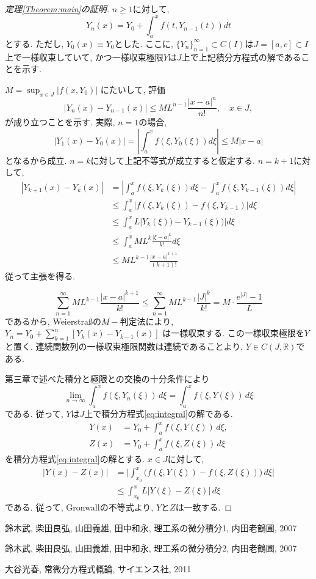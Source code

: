 \documentclass[12pt,xelatex,ja=standard]{bxjsarticle}
\begin{document}
\begin{proof}[定理\ref{Theorem:main}の証明]
$n \geq 1$に対して,
	\[
	Y_{n}(x)=Y_{0}+\displaystyle \int_{a}^{x} f(t,Y_{n-1}(t)) dt
	\]
とする. ただし, $Y_{0}(x) \equiv Y_0$とした.
ここに,
$\{Y_{n}\}_{n=1}^{\infty} ⊂ C(I)$は$J = [a,c] ⊂ I$上で一様収束していて,
かつ一様収束極限$Y$は$J$上で上記積分方程式の解であることを示す.

$M = \sup_{x \in J} |f(x, Y_0)|$
にたいして,
評価
	\[
	| Y_{n}(x) - Y_{n-1}(x) |
	\leq M L^{n-1} \frac{|x - a|^{n}}{n!}, \quad x \in J,
	\]
が成り立つことを示す.
実際, $n=1$の場合,
	\[
	\left| Y_{1}(x)-Y_{0}(x) \right|
	=\left|\displaystyle \int_{a}^{x} f(\xi,Y_{0}(\xi)) d\xi
	\right|\leq M|x-a|
	\]
となるから成立.
$n=k$に対して上記不等式が成立すると仮定する.
$n=k+1$に対して,
	\begin{align*}
	\left| Y_{k+1}(x)-Y_{k}(x) \right|
	&=  \left| \int_{a}^{x} f(\xi,Y_{k}(\xi)) d\xi
	- \int_{a}^{x}  f(\xi,Y_{k-1}(\xi)) d\xi\right|\\
	&\leq \int_{a}^{x} \left|f(\xi,Y_{k}(\xi))-f(\xi,Y_{k-1})\right| d\xi\\
	&\leq \int_{a}^{x} L\left|Y_{k}(\xi))-Y_{k-1}(\xi))\right| d\xi\\
	&\leq \int_{a}^{x}ML^{k} \frac{|\xi - a|^{k}}{k!} d\xi\\
	&\leq ML^{k-1}\frac{|x - a|^{k+1}}{(k+1)!}
	\end{align*}
従って主張を得る.

	\[
	\sum_{n=1}^{\infty}ML^{k-1} \frac{|x - a|^{k+1}}{k!}
	\leq \sum_{n=1}^{\infty} M L^{k-1}\frac{|J|^{k}}{k!}
	=M \cdot \frac{e^{|J|}-1}{L}
	\]
であるから,
Weierstraßの$M-$判定法により,
$Y_{n}=Y_{0}+\sum_{k=1}^{n} [Y_{k}(x)-Y_{k-1}(x)]$
は一様収束する.
この一様収束極限を$Y$と置く.
連続関数列の一様収束極限関数は連続であることより,
$Y ∈ C(J, \mathbb R)$である.

第三章で述べた積分と極限との交換の十分条件により
	\[
	\lim_{n \to \infty} \int_{a}^{x} f(\xi,Y_{n}(\xi)) \, d\xi
	= \int_{a}^{x} f(\xi,Y(\xi)) \, d\xi
	\]
である.
従って, $Y$は$J$上で積分方程式\eqref{eq:integral}の解である.
	\begin{align*}
	Y(x) &= Y_{0} + \int_{a}^{x} f(\xi, Y(\xi)) \, d\xi,\\
	Z(x) &= Y_{0} + \int_{a}^{x} f(\xi, Z(\xi)) \, d\xi
	\end{align*}
を積分方程式\eqref{eq:integral}の解とする.
$x \in J$に対して,
	\begin{align*}
	|Y(x) - Z(x)|
	&= \bigg| \int_{x_{0}}^{x} \big( f(\xi, Y(\xi)) - f(\xi, Z(\xi)) \big) \, d\xi \bigg|\\
	&\leq \int_{x_{0}}^{x} L |Y(\xi) - Z(\xi)| \, d\xi
	\end{align*}
である.
従って, Gronwallの不等式より, $Y$と$Z$は一致する.
\end{proof}

\begin{thebibliography}{9}
鈴木武, 柴田良弘, 山田義雄, 田中和永, 理工系の微分積分1, 内田老鶴圃, 2007

鈴木武, 柴田良弘, 山田義雄, 田中和永, 理工系の微分積分2, 内田老鶴圃, 2007

大谷光春, 常微分方程式概論, サイエンス社, 2011
\end{thebibliography}
\end{document}
